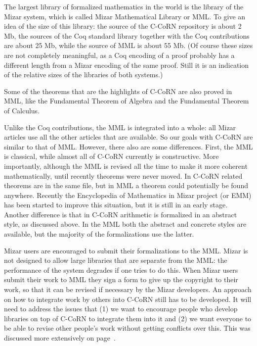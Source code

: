 \documentclass[runningheads]{llncs}
\newcommand{\ccorn}{\mbox{C-CoRN}}
\begin{document}
The largest library of formalized mathematics in the world is
the library of the Mizar system, which is called
Mizar Mathematical Library or MML.
To give an idea of the size of this library:
the source of the {\ccorn} repository is about 2 Mb,
the sources of the Coq standard library together with
the Coq contributions are about 25 Mb,
while the source of MML is about 55 Mb.
(Of course these sizes are not completely meaningful, as
a Coq encoding of a proof probably has a different length
{from} a Mizar encoding of the same proof.
Still it is an indication of the relative sizes of the libraries
of both systems.)

Some of the theorems that are the highlights of
{\ccorn} are also proved in MML,
like the Fundamental Theorem of Algebra and the Fundamental Theorem of
Calculus.

Unlike the Coq contributions, the MML is integrated into
a whole: all Mizar articles use all the other articles that are available.
So our goals with {\ccorn} are similar to that of MML.
However, there also are some differences.
First, the MML is classical, while almost all of {\ccorn} currently is
constructive.
More importantly, although the MML is revised all the time
to make it more coherent mathematically,
until recently theorems were never moved.
In {\ccorn} related theorems are in the same file,
but in MML a theorem could potentially be found anywhere.
Recently the Encyclopedia of Mathematics in Mizar project (or EMM)
has been started to improve this situation, but it is still
in an early stage.
Another difference is that in {\ccorn} arithmetic is formalized
in an abstract style, as discussed above.
In the MML both the abstract and concrete styles are available,
but the majority of the formalizations use the latter.

Mizar users are encouraged to submit their formalizations to the MML.
Mizar is not designed to allow large libraries that are separate
{from} the MML: the performance of the system degrades if one tries to
do this.  When Mizar users submit their work to MML they sign a form
to give up the copyright to their work, so that it can be revised if
necessary by the Mizar developers.  An approach on how to integrate
work by others into {\ccorn} still has to be developed.  
It will need to address the issues that (1) we want to encourage
people who develop libraries on top of {\ccorn} to integrate them into
it and (2) we want everyone to be able to revise other people's work
without getting conflicts over this.
This was discussed more extensively on page~\pageref{contradictions}.
\end{document}
